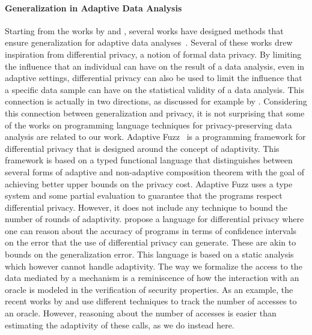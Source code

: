 \paragraph{Generalization in Adaptive Data Analysis}
Starting from the works by \citet{DworkFHPRR15} and \citet{HardtU14}, several works have designed methods that ensure generalization for adaptive data analyses~\cite{dwork2015reusable,dwork2015generalization,BassilyNSSSU16,UllmanSNSS18,FeldmanS17,jung2019new,SteinkeZ20,RogersRSSTW20}.
Several of these works drew inspiration from differential privacy, a notion of formal data privacy. By limiting the influence that an individual can have on the result of a data analysis, even in adaptive settings, differential privacy can also be used to limit the influence that a specific data sample can have on the statistical validity of a data analysis. This connection is actually in two directions, as discussed for example by \citet{YeomGFJ18}.
%
Considering this connection between generalization and privacy, it is not surprising that some of the works on programming language techniques for privacy-preserving data analysis are related to our work. 
Adaptive Fuzz~\cite{Winograd-CortHR17} is a programming framework for differential privacy that is designed around the concept of adaptivity. 
This framework is based on a typed functional language that distinguishes between several forms of adaptive and non-adaptive composition theorem with the goal of achieving better upper bounds on the privacy cost. Adaptive Fuzz uses a type system and some partial evaluation to guarantee that the programs respect differential privacy. However, it does not include any technique to bound the number of rounds of adaptivity. 
\citet{lobo2021programming} propose a language for differential privacy where one can reason about the accuracy of programs in terms of confidence intervals on the error that the use of differential privacy can generate. These are akin to bounds on the generalization error. This language is based on a static analysis which however cannot handle adaptivity. 
%
The way we formalize the access to the data mediated by a mechanism is a reminiscence of how the interaction with an oracle is modeled in the verification of security properties. As an example, the recent works by \citet{BarbosaBGKS21} and \citet{AguirreBGGKS21} use different techniques to track the number of accesses to an oracle. However, reasoning about the number of accesses is easier than estimating the adaptivity of these calls, as we do instead here.


